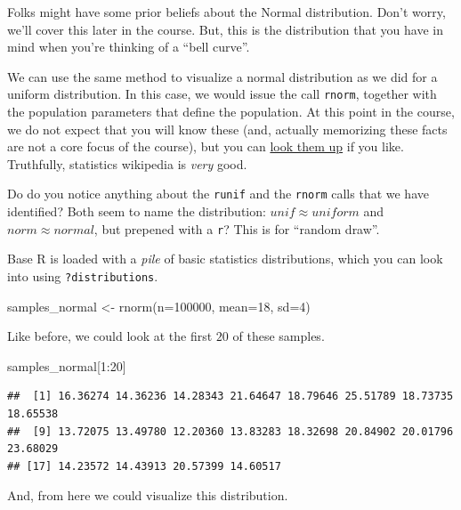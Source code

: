 \documentclass[
]{book}
\newenvironment{Shaded}{\begin{snugshade}}{\end{snugshade}}
\newcommand{\AttributeTok}[1]{\textcolor[rgb]{0.77,0.63,0.00}{#1}}
\newcommand{\DecValTok}[1]{\textcolor[rgb]{0.00,0.00,0.81}{#1}}
\newcommand{\FunctionTok}[1]{\textcolor[rgb]{0.00,0.00,0.00}{#1}}
\newcommand{\NormalTok}[1]{#1}
\newcommand{\OtherTok}[1]{\textcolor[rgb]{0.56,0.35,0.01}{#1}}
\newcommand{\SpecialCharTok}[1]{\textcolor[rgb]{0.00,0.00,0.00}{#1}}
\theoremstyle{definition}
\theoremstyle{definition}
\theoremstyle{definition}
\theoremstyle{definition}
\theoremstyle{remark}
\begin{document}
Folks might have some prior beliefs about the Normal distribution. Don't worry, we'll cover this later in the course. But, this is the distribution that you have in mind when you're thinking of a ``bell curve''.

We can use the same method to visualize a normal distribution as we did for a uniform distribution. In this case, we would issue the call \texttt{rnorm}, together with the population parameters that define the population. At this point in the course, we do not expect that you will know these (and, actually memorizing these facts are not a core focus of the course), but you can \href{https://en.wikipedia.org/wiki/Normal_distribution}{look them up} if you like. Truthfully, statistics wikipedia is \emph{very} good.

Do do you notice anything about the \texttt{runif} and the \texttt{rnorm} calls that we have identified? Both seem to name the distribution: \(unif \approx uniform\) and \(norm \approx normal\), but prepened with a \texttt{r}? This is for ``random draw''.

Base R is loaded with a \emph{pile} of basic statistics distributions, which you can look into using \texttt{?distributions}.

\begin{Shaded}
\begin{Highlighting}[]
\NormalTok{samples\_normal }\OtherTok{\textless{}{-}} \FunctionTok{rnorm}\NormalTok{(}\AttributeTok{n=}\DecValTok{100000}\NormalTok{, }\AttributeTok{mean=}\DecValTok{18}\NormalTok{, }\AttributeTok{sd=}\DecValTok{4}\NormalTok{)}
\end{Highlighting}
\end{Shaded}

Like before, we could look at the first \(20\) of these samples.

\begin{Shaded}
\begin{Highlighting}[]
\NormalTok{samples\_normal[}\DecValTok{1}\SpecialCharTok{:}\DecValTok{20}\NormalTok{]}
\end{Highlighting}
\end{Shaded}

\begin{verbatim}
##  [1] 16.36274 14.36236 14.28343 21.64647 18.79646 25.51789 18.73735 18.65538
##  [9] 13.72075 13.49780 12.20360 13.83283 18.32698 20.84902 20.01796 23.68029
## [17] 14.23572 14.43913 20.57399 14.60517
\end{verbatim}

And, from here we could visualize this distribution.
\end{document}
